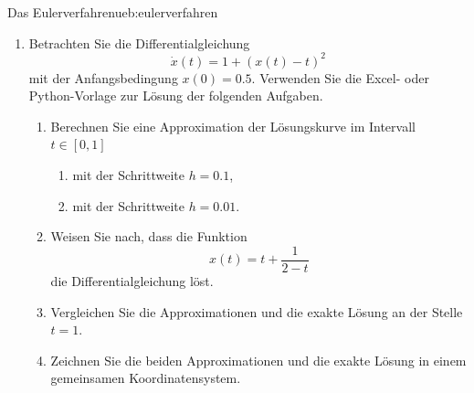 \begin{ueb}{Das Eulerverfahren}{ueb:eulerverfahren}
\begin{enumerate}
\begin{enumerate}
                        \textit{Tipp:} In Excel berechnet
                        \texttt{EXP(x)} den Wert von \(e^x\).
                        In Python können Sie dazu
                        \texttt{math.exp(x)} verwenden.

                  \item Zeichnen Sie die Graphen der beiden
                        Approximationen und der exakten Lösung
                        in einem gemeinsamen Koordinatensystem.

                        Verwenden Sie in Excel ein
                        \enquote{Punkt XY}-Diagramm oder in Python
                        eine entsprechende grafische Darstellung.
              \end{enumerate}

        \item Betrachten Sie die Differentialgleichung
              \[
                  \dot{x}(t)=1+(x(t)-t)^2
              \]
              mit der Anfangsbedingung \(x(0)=0.5\).
              Verwenden Sie die Excel- oder Python-Vorlage
              zur Lösung der folgenden Aufgaben.

              \begin{enumerate}
                  \item Berechnen Sie eine Approximation der
                        Lösungskurve im Intervall \(t\in[0,1]\)

                        \begin{enumerate}[label=\roman*)]
                            \item mit der Schrittweite \(h=0.1\),
                            \item mit der Schrittweite \(h=0.01\).
                        \end{enumerate}

                  \item Weisen Sie nach, dass die Funktion
                        \[
                            x(t)=t+\frac{1}{2-t}
                        \]
                        die Differentialgleichung löst.

                  \item Vergleichen Sie die Approximationen und
                        die exakte Lösung an der Stelle \(t=1\).

                  \item Zeichnen Sie die beiden Approximationen
                        und die exakte Lösung in einem gemeinsamen
                        Koordinatensystem.
              \end{enumerate}


\end{enumerate}
\end{ueb}
